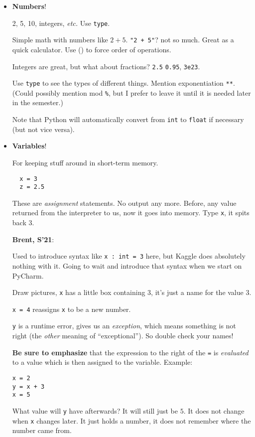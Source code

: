 \documentclass{article}
\newcommand{\etc}{\emph{etc.}\xspace}
\newenvironment{reflect}[1]
{
  \noindent
  \begin{lrbox}{\reflectbox}
    \begin{minipage}[t]{\textwidth}
      \textbf{#1}:
}{
    \end{minipage}
  \end{lrbox}
  \fbox{\usebox{\reflectbox}}
}
\begin{document}
\begin{itemize}
\item \textbf{Numbers}!

  2, 5, 10, integers, \etc  Use \texttt{type}.

  Simple math with numbers like $2+5$. \texttt{"2 + 5"}? not so much.
  Great as a quick calculator. Use () to force order of operations.

  Integers are great, but what about fractions? \texttt{2.5}
  \texttt{0.95}, \texttt{3e23}.

  Use \verb|type| to see the types of different things.  Mention
  exponentiation \verb|**|. (Could possibly mention mod \verb|%|, but
  I prefer to leave it until it is needed later in the semester.)

  Note that Python will automatically convert from \verb|int| to
  \verb|float| if necessary (but not vice versa).

\item \textbf{Variables}!

  For keeping stuff around in short-term memory.
\begin{verbatim}
  x = 3
  z = 2.5
\end{verbatim}
  These are \emph{assignment} statements.  No output any more. Before,
  any value returned from the interpreter to us, now it goes into
  memory.  Type \texttt{x}, it spits back 3.

  \begin{reflect}{Brent, S'21}
    Used to introduce syntax like \texttt{x : int = 3} here, but
    Kaggle does absolutely nothing with it.  Going to wait and
    introduce that syntax when we start on PyCharm.
  \end{reflect}


  Draw pictures, \texttt{x} has a little box containing $3$, it's just a
  name for the value $3$.

  \texttt{x = 4} reassigns \texttt{x} to be a new number.

  \texttt{y} is a runtime error, gives us an \emph{exception}, which
  means something is not right (the \emph{other} meaning of
  ``exceptional''). So double check your names!

  \textbf{Be sure to emphasize} that the expression to the right of
  the \texttt{=} is \emph{evaluated} to a value which is then assigned
  to the variable.  Example:
\begin{verbatim}
x = 2
y = x + 3
x = 5
\end{verbatim}
  What value will \texttt{y} have afterwards?  It will still just be
  $5$.  It does not change when \texttt{x} changes later.  It just
  holds a number, it does not remember where the number came from.


\end{itemize}
\end{document}
